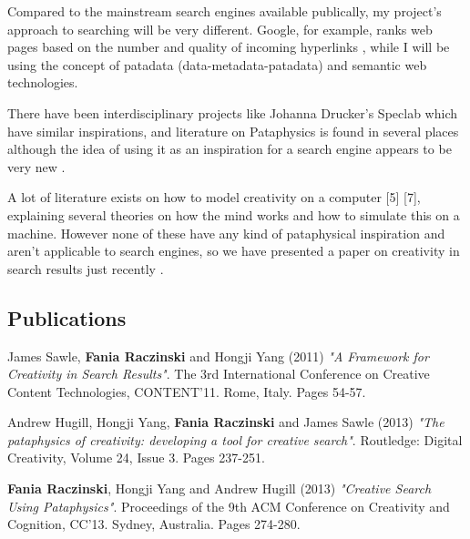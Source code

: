 Compared to the mainstream search engines available publically, my project's approach to searching will be very different. Google, for example, ranks web pages based on the number and quality of incoming hyperlinks \citep{Google2012}, while I will be using the concept of patadata (data-metadata-patadata) and semantic web technologies.

There have been interdisciplinary projects like Johanna Drucker's Speclab \citep{Drucker2009} which have similar inspirations, and literature on Pataphysics is found in several places \citep{Bok2002, Hugill2012a} although the idea of using it as an inspiration for a search engine appears to be very new \citep{Hendler2013}.

A lot of literature exists on how to model creativity on a computer [5] [7], explaining several theories on how the mind works and how to simulate this on a machine. However none of these have any kind of pataphysical inspiration and aren't applicable to search engines, so we have presented a paper on creativity in search results just recently \citep{Raczinski2013}.

\subsection{Publications}

James Sawle, \textbf{Fania Raczinski} and Hongji Yang (2011) \emph{"A Framework for Creativity in Search Results"}. The 3rd International Conference on Creative Content Technologies, CONTENT'11. Rome, Italy. Pages 54-57.

\noindent Andrew Hugill, Hongji Yang, \textbf{Fania Raczinski} and James Sawle (2013) \emph{"The pataphysics of creativity: developing a tool for creative search"}. Routledge: Digital Creativity, Volume 24, Issue 3. Pages 237-251.

\noindent \textbf{Fania Raczinski}, Hongji Yang and Andrew Hugill (2013) \emph{"Creative Search Using Pataphysics"}. Proceedings of the 9th ACM Conference on Creativity and Cognition, CC'13. Sydney, Australia. Pages 274-280.
